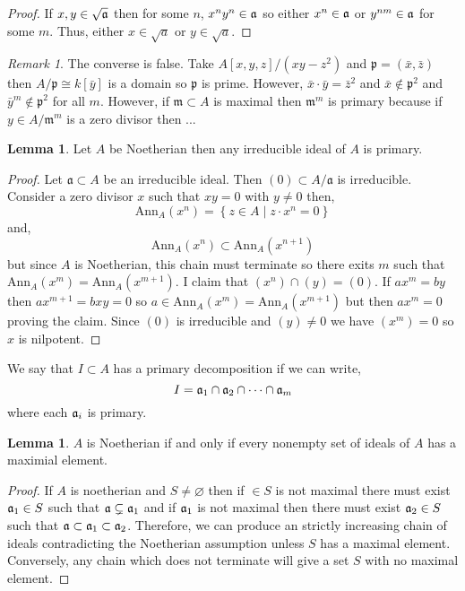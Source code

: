 \documentclass[12pt]{article}
\newcommand{\Ann}[2]{\mathrm{Ann}_{#1}\left(#2\right)}
\newcommand{\m}{\mathfrak{m}}
\theoremstyle{remark}
\newtheorem*{remark}{Remark}
\theoremstyle{definition}
\newtheorem{lemma}[theorem]{Lemma}
\newenvironment{definition}[1][Definition:]{\begin{trivlist}
\item[\hskip \labelsep {\bfseries #1}]}{\end{trivlist}}
\begin{document}
\begin{proof}
If $x,y \in \sqrt{\mathfrak{a}}$ then for some $n$, $x^n y^n \in \mathfrak{a}$ so either $x^n \in \mathfrak{a}$ or $y^{nm} \in \mathfrak{a}$ for some $m$. Thus, either $x \in \sqrt{a}$ or $y \in \sqrt{a}$. 
\end{proof}

\begin{remark}
The converse is false. Take $A[x,y,z] / (xy - z^2)$ and $\mathfrak{p} = (\bar{x}, \bar{z})$ then $A / \mathfrak{p} \cong k[\bar{y}]$ is a domain so $\mathfrak{p}$ is prime. However, $\bar{x} \cdot \bar{y} = \bar{z}^2$ and $\bar{x} \notin \mathfrak{p}^2$ and $\bar{y}^m \notin \mathfrak{p}^2$ for all $m$. However, if $\m \subset A$ is maximal then $\m^m$ is primary because if $y \in A / \m^m$ is a zero divisor then ...
\end{remark}

\begin{lemma}
Let $A$ be Noetherian then any irreducible ideal of $A$ is primary.
\end{lemma}


\begin{proof}
Let $\mathfrak{a} \subset A$ be an irreducible ideal. Then $(0) \subset A / \mathfrak{a}$ is irreducible. Consider a zero divisor $x$ such that $xy = 0$ with $y \neq 0$ then,
\[ \Ann{A}{x^n} = \left\{ z \in A \mid z \cdot x^n = 0 \right\} \]
and,
\[ \Ann{A}{x^n} \subset \Ann{A}{x^{n+1}} \]
but since $A$ is Noetherian, this chain must terminate so there exits $m$ such that $\Ann{A}{x^m} = \Ann{A}{x^{m+1}}$. I claim that $(x^n) \cap (y) = (0)$. If $a x^m = by$ then $a x^{m+1} = b xy = 0$ so $a \in \Ann{A}{x^m} = \Ann{A}{x^{m+1}}$ but then $a x^{m} = 0$ proving the claim. Since $(0)$ is irreducible and $(y) \neq 0$ we have $(x^m) = 0$ so $x$ is nilpotent.  
\end{proof}


\begin{definition}
We say that $I \subset A$ has a primary decomposition if we can write,
\[ I = \mathfrak{a}_1 \cap \mathfrak{a}_2 \cap \cdots \cap \mathfrak{a}_m \]
where each $\mathfrak{a}_i$ is primary. 
\end{definition}

\begin{lemma}
$A$ is Noetherian if and only if every nonempty set of ideals of $A$ has a maximial element. 
\end{lemma}

\begin{proof}
If $A$ is noetherian and $S \neq \varnothing$ then if $\in S$ is not maximal there must exist $\mathfrak{a}_1 \in S$ such that $\mathfrak{a} \subsetneq \mathfrak{a}_1$ and if $\mathfrak{a}_1$ is not maximal then there must exist $\mathfrak{a}_2 \in S$ such that $\mathfrak{a} \subset \mathfrak{a}_1 \subset \mathfrak{a}_2$. Therefore, we can produce an strictly increasing chain of ideals contradicting the Noetherian assumption unless $S$ has a maximal element. Conversely, any chain which does not terminate will give a set $S$ with no maximal element. 
\end{proof}
\end{document}
